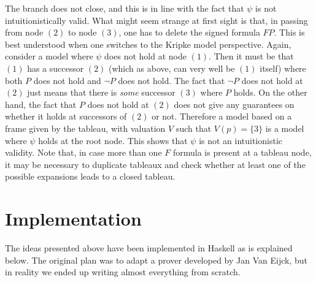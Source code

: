 \begin{center}
\end{center}

The branch does not close, and this is in line with the fact that $\psi$ is not intuitionistically valid. What might seem strange at first sight is that, in passing from node $(2)$ to node $(3)$, one has to delete the signed formula $FP$. This is best understood when one switches to the Kripke model perspective. Again, consider a model where $\psi$ does not hold at node $(1)$. Then it must be that $(1)$ has a successor $(2)$ (which as above, can very well be $(1)$ itself) where both $P$ does not hold and $\neg P$ does not hold. The fact that $\neg P$ does not hold at $(2)$ just means that there is \textit{some} successor $(3)$ where $P$ holds. On the other hand, the fact that $P$ does not hold at $(2)$ does not give any guarantees on whether it holds at successors of $(2)$ or not. Therefore a model based on a frame given by the tableau, with valuation $V$ such that $V(p)=\{3\}$ is a model where $\psi$ holds at the root node. This shows that $\psi$ is not an intuitionistic validity. Note that, in case more than one $F$ formula is present at a tableau node, it may be necessary to duplicate tableaux and check whether at least one of the possible expansions leads to a closed tableau.

\newpage

\section{Implementation}

The ideas presented above have been implemented in Haskell as is explained below. The original plan was to adapt a prover developed by Jan Van Eijck, but in reality we ended up writing almost everything from scratch.

